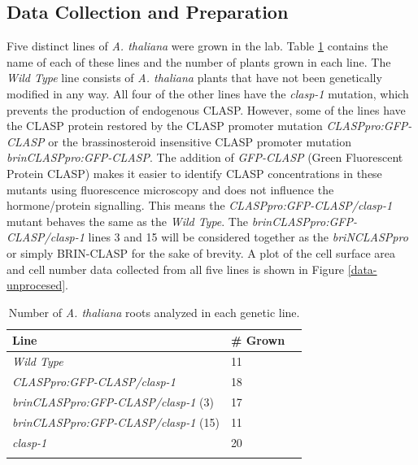 \documentclass[referee,pdflatex,sn-mathphys-num]{sn-jnl}
\begin{document}
\begin{appendices}

\section{Data Collection and Preparation}\label{secA1}

Five distinct lines of \emph{A. thaliana} were grown in the lab.
Table \ref{plant-lines} contains the name of each of these lines and the number of plants grown in each line.
The \emph{Wild Type} line consists of \emph{A. thaliana} plants that have not been genetically modified in any way.
All four of the other lines have the \emph{clasp-1} mutation, which prevents the production of endogenous CLASP.
However, some of the lines have the CLASP protein restored by the CLASP promoter mutation \emph{CLASPpro:GFP-CLASP} or the brassinosteroid insensitive CLASP promoter mutation \emph{brinCLASPpro:GFP-CLASP}.
The addition of \emph{GFP-CLASP} (Green Fluorescent Protein CLASP) makes it easier to identify CLASP concentrations in these mutants using fluorescence microscopy and does not influence the hormone/protein signalling.
This means the \emph{CLASPpro:GFP-CLASP/clasp-1} mutant behaves the same as the \emph{Wild Type}.
The \emph{brinCLASPpro:GFP-CLASP/clasp-1} lines 3 and 15 will be considered together as the \emph{briNCLASPpro} or simply BRIN-CLASP for the sake of brevity.
A plot of the cell surface area and cell number data collected from all five lines is shown in Figure \ref{data-unprocesed}.

\begin{table}[!ht]
\centering
\caption{Number of \emph{A. thaliana} roots analyzed in each genetic line.}
\label{plant-lines}
\begin{tabular}{@{}lll@{}}
\toprule
Line & \# Grown \\
\midrule
\emph{Wild Type}  & 11  \\
\emph{CLASPpro:GFP-CLASP/clasp-1} & 18 \\
\emph{brinCLASPpro:GFP-CLASP/clasp-1} (3) & 17 \\
\emph{brinCLASPpro:GFP-CLASP/clasp-1} (15) & 11 \\
\emph{clasp-1} & 20 \\
\botrule
\end{tabular}
\end{table}


\end{appendices}
\end{document}
